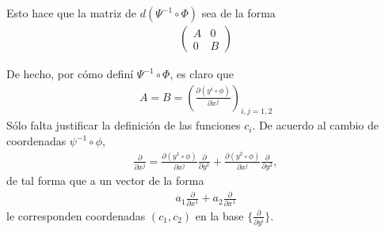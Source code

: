 \documentclass[11pt]{article}
\begin{document}
	Esto hace que la matriz de $d(\Psi^{-1}\circ\Phi)$ sea de la forma 
	\begin{align*}
		\begin{pmatrix}
			A & 0 \\
			0 & B
		\end{pmatrix}
	\end{align*}
	\par De hecho, por cómo definí $\Psi^{-1}\circ\Phi$, es claro que
	\begin{align*}
		A=B=\left(\frac{\partial (y^i\circ \phi)}{\partial x^j}\right)_{i,j=1,2}
	\end{align*}
	Sólo falta justificar la definición de las funciones $c_i$. De acuerdo al cambio de coordenadas $\psi^{-1}\circ\phi$,
	\begin{align*}
		\frac{\partial}{\partial x^j}=\frac{\partial (y^1\circ \phi)}{\partial x^j}\frac{\partial}{\partial y^1}+\frac{\partial (y^2\circ \phi)}{\partial x^j}\frac{\partial}{\partial y^2},
	\end{align*}
	de tal forma que a un vector de la forma
	\begin{align*}
		a_1\frac{\partial}{\partial x^1}+a_2\frac{\partial}{\partial x^1}
	\end{align*}
	le corresponden coordenadas $(c_1,c_2)$ en la base $\big\{ \frac{\partial}{\partial y^i}\big\}$.
	\newpage
\end{document}
